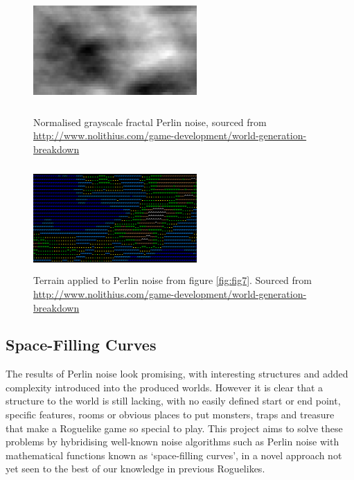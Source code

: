 \documentclass[12pt,a4paper]{article}
\begin{document}
\begin{figure}[h!]
\begin{minipage}{.5\textwidth}
  	\centering
 	\includegraphics[width=6.25cm,height=4cm]{images/perlin2.png}
	\caption[]{Normalised grayscale fractal Perlin noise, sourced from \url{http://www.nolithius.com/game-development/world-generation-breakdown}}
	\label{fig:fig7}
	\end{minipage}
	\begin{minipage}{.5\textwidth}
 	\centering
 	\includegraphics[width=6.25cm,height=4cm]{images/terrain.png}
	\caption[]{Terrain applied to Perlin noise from figure \ref{fig:fig7}. Sourced from \url{http://www.nolithius.com/game-development/world-generation-breakdown}}
	\label{fig:fig8}
\end{minipage}
\end{figure}


\subsection{Space-Filling Curves}

The results of Perlin noise look promising, with interesting structures and added complexity introduced into the produced worlds. However it is clear that a structure to the world is still lacking, with no easily defined start or end point, specific features, rooms or obvious places to put monsters, traps and treasure that make a Roguelike game so special to play. This project aims to solve these problems by hybridising well-known noise algorithms such as Perlin noise with mathematical functions known as `space-filling curves', in a novel approach not yet seen to the best of our knowledge in previous Roguelikes.\\
\end{document}
